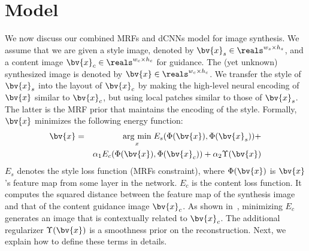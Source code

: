 \documentclass[10pt,twocolumn,letterpaper]{article}
\newcommand{\argmin}[1]{\underset{#1}{\operatorname{arg}\,\operatorname{min}}\;}
\begin{document}
\section{Model}
We now discuss our combined MRFs and dCNNs model for image synthesis. We assume that we are given a style image, denoted by $\bv{x}_s \in \reals^{w_s \times h_s}$, and a content image $\bv{x}_c \in \reals^{w_c \times h_c}$ for guidance. The (yet unknown) synthesized image is denoted by $\bv{x} \in \reals^{w_c \times h_c}$. We transfer the style of $\bv{x}_s$ into the layout of $\bv{x}_c$ by making the high-level neural encoding of $\bv{x}$ similar to $\bv{x}_c$, but using local patches similar to those of $\bv{x}_s$. The latter is the MRF prior that maintains the encoding of the style.
%
%
Formally, $\bv{x}$ minimizes the following energy function:
%
\begin{eqnarray}
\bv{x}&= &\argmin{x}E_{s}(\Phi(\bv{x}), \Phi(\bv{x}_{s})) + \nonumber \\&& \alpha_{1}E_{c}(\Phi(\bv{x}), \Phi(\bv{x}_{c})) + \alpha_{2}\Upsilon(\bv{x})
\label{eq:energy}
\end{eqnarray}
%
$E_{s}$ denotes the style loss function (MRFs constraint), where $\Phi(\bv{x})$ is $\bv{x}$'s feature map from some layer in the network. 
%
$E_{c}$ is the content loss function. It computes the squared distance between the feature map of the synthesis image and that of the content guidance image $\bv{x}_{c}$. As shown in~\cite{Gatys15,Mahendran15}, minimizing $E_{c}$ generates an image that is contextually related to $\bv{x}_{c}$. The additional regularizer $\Upsilon(\bv{x})$ is a smoothness prior on the reconstruction. Next, we explain how to define these terms in details.
%
\end{document}
